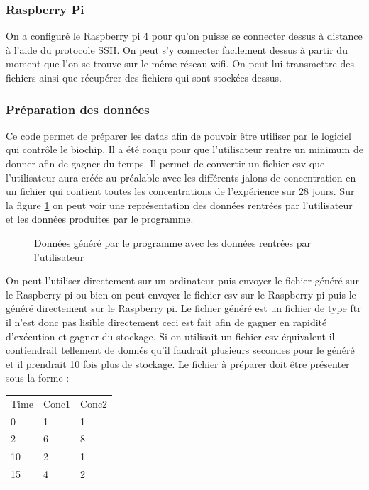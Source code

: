 \documentclass[a4paper, 11pt]{article}
\begin{document}
\subsubsection{Raspberry Pi}
On a configuré le Raspberry pi 4 pour qu'on puisse se connecter dessus à distance à l'aide du protocole SSH.
On peut s'y connecter facilement dessus à partir du moment que l'on se trouve sur le même réseau wifi.
On peut lui transmettre des fichiers ainsi que récupérer des fichiers qui sont stockées dessus.
\subsubsection{Préparation des données}
Ce code permet de préparer les datas afin de pouvoir être utiliser par le logiciel qui contrôle le biochip.
Il a été conçu pour que l'utilisateur rentre un minimum de donner afin de gagner du temps.
Il permet de convertir un fichier csv que l'utilisateur aura créée au préalable avec les différents jalons de concentration en un fichier qui contient toutes les concentrations de l'expérience sur 28 jours.
Sur la figure \ref{fig:dataPreparation} on peut voir une représentation des données rentrées par l'utilisateur et les données produites par le programme.
\begin{figure}[H]
    \centering
    \caption{Données généré par le programme avec les données rentrées par l'utilisateur}
    \label{fig:dataPreparation}
\end{figure}
On peut l'utiliser directement sur un ordinateur puis envoyer le fichier généré sur le Raspberry pi ou bien on peut envoyer le fichier csv sur le Raspberry pi puis le généré directement sur le Raspberry pi.
Le fichier généré est un fichier de type ftr il n'est donc pas lisible directement ceci est fait afin de gagner en rapidité d'exécution et gagner du stockage.
Si on utilisait un fichier csv équivalent il contiendrait tellement de donnés qu'il faudrait plusieurs secondes pour le généré et il prendrait 10 fois plus de stockage.
Le fichier à préparer doit être présenter sous la forme :
\begin{table}[H]
    \centering
    \begin{tabular}{lll}
        Time & Conc1 & Conc2 \\
        0    & 1     & 1     \\
        2    & 6     & 8     \\
        10   & 2     & 1     \\
        15   & 4     & 2
    \end{tabular}
\end{table}
\end{document}

